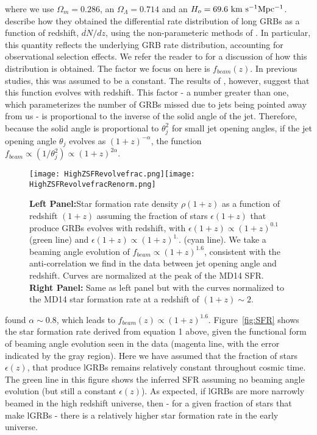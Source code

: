 \documentclass[fleqn,usenatbib,useAMS]{mnras}
\begin{document}
 \noindent where we use $\Omega_{m} = 0.286$, an $\Omega_{\Lambda} = 0.714$ and an $H_{o} = 69.6 \ {\rm km \ s^{-1} Mpc^{-1}}$.   \cite{LR19} describe how they obtained the differential rate distribution of long GRBs as a function of redshift, $\dot{dN}/dz$, using the non-parameteric methods of \cite{LB71,EP92,ep98}. In particular, this quantity reflects the underlying GRB rate distribution, accounting for observational selection effects.  We refer the reader to \cite{LR19} for a discussion of how this distribution is obtained.  The factor we focus on here is $f_{beam}(z)$.  In previous studies, this was assumed to be a constant.  The results of \cite{LR19,LR20}, however, suggest that this function evolves with redshift.  This factor - a number greater than one, which parameterizes the number of GRBs missed due to jets being pointed away from us - is proportional to the inverse of the solid angle of the jet.  Therefore, because the solid angle is proportional to $\theta_{j}^{2}$ for small jet opening angles, if the jet opening angle $\theta_{j}$ evolves as $(1+z)^{-\alpha}$, the function $f_{beam} \propto (1/\theta_{j}^{2}) \propto (1+z)^{2\alpha}$.
  
  \begin{figure*}
    \centering
    \texttt{[image: HighZSFRevolvefrac.png]}\texttt{[image: HighZSFRevolvefracRenorm.png]}
    \caption{{\bf Left Panel:}Star formation rate density $\rho(1+z)$ as a function of redshift $(1+z)$ assuming the fraction of stars $\epsilon(1+z)$ that produce GRBs evolves with redshift, with $\epsilon(1+z) \propto (1+z)^{0.1}$ (green line) and $\epsilon(1+z) \propto (1+z)^{1.}$. (cyan line).  We take a beaming angle evolution of $f_{beam} \propto (1+z)^{1.6}$, consistent with the anti-correlation we find in the data between jet opening angle and redshift. Curves are normalized at the peak of the MD14 SFR.  {\bf Right Panel:} Same as left panel but with the curves normalized to the MD14 star formation rate at a redshift of $(1+z) \sim 2$.}
    \label{fig:SFRevolv}
\end{figure*}

  \cite{LR19} found $\alpha \sim 0.8$, which leads to $f_{beam}(z) \propto (1+z)^{1.6}$.   Figure~\ref{fig:SFR} shows the star formation rate derived from equation 1 above, given the functional form of beaming angle evolution seen in the data (magenta line, with the error indicated by the gray region). Here we have assumed that the fraction of stars $\epsilon(z)$, that produce lGRBs remains relatively constant throughout cosmic time. The green line in this figure shows the inferred SFR assuming no beaming angle evolution (but still a constant $\epsilon(z)$).  As expected, if lGRBs are more narrowly beamed in the high redshift universe, then - for a given fraction of stars that make lGRBs - there is a relatively higher star formation rate in the early universe.
  
\end{document}
